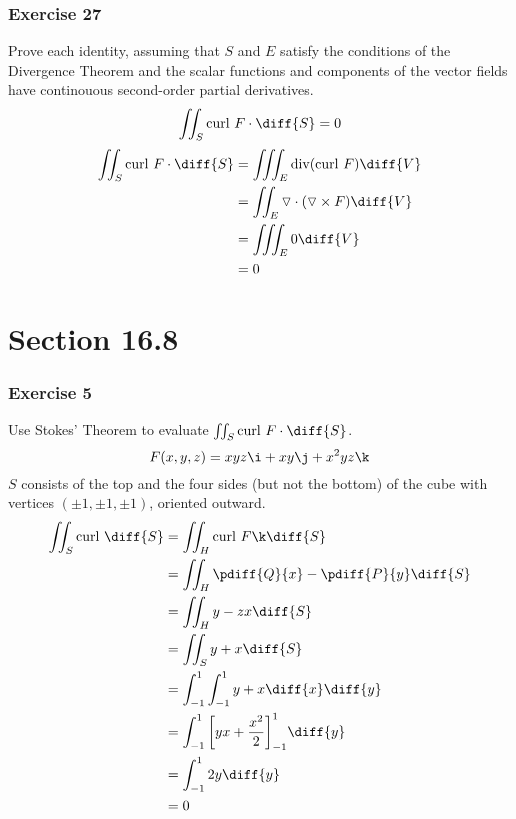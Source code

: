 \documentclass{math}
\begin{document}
\subsubsection*{Exercise 27}
Prove each identity, assuming that \( S \) and \( E \) satisfy the conditions of
the Divergence Theorem and the scalar functions and components of the vector
fields have continouous second-order partial derivatives.
\[ \iint_{S}\text{curl}~F\cdot\diff{S} = 0 \]
\begin{align*}
  \iint_{S}\text{curl}~F\cdot\diff{S} &=
    \iiint_{E}\text{div}(\text{curl}~F)\diff{V} \\
  &= \iint_{E}\triangledown\cdot(\triangledown\times F)\diff{V} \\
  &= \iiint_{E}0\diff{V} \\
  &= 0
\end{align*}

\section*{Section 16.8}

\subsubsection*{Exercise 5}
Use Stokes' Theorem to evaluate \( \iint_{S}\text{curl}~F\cdot\diff{S} \).
\[ F(x,y,z) = xyz\i+xy\j+x^2yz\k \]
\( S \) consists of the top and the four sides (but not the bottom) of the cube
with vertices \( (\pm1,\pm1,\pm1) \), oriented outward.
\begin{align*}
  \iint_{S}\text{curl}~\diff{S} &=
    \iint_{H}\text{curl}~F\k\diff{S} \\
  &= \iint_{H}\pdiff{Q}{x}-\pdiff{P}{y}\diff{S} \\
  &= \iint_{H}y-zx\diff{S} \\
  &= \iint_{S}y+x\diff{S} \\
  &= \int_{-1}^{1}\int_{-1}^{1}y+x\diff{x}\diff{y} \\
  &= \int_{-1}^{1}\bigg[yx+\frac{x^2}{2}\bigg]_{-1}^{1}\diff{y} \\
  &= \int_{-1}^{1}2y\diff{y} \\
  &= 0
\end{align*}
\end{document}
